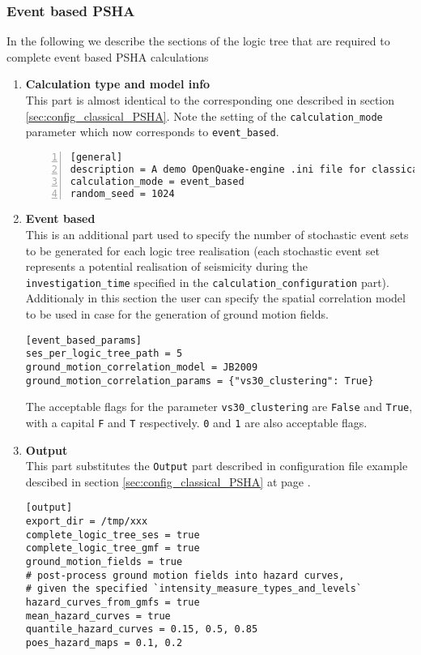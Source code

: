 \subsubsection{Event based PSHA}
%
In the following we describe the sections of the logic tree that are 
required to complete event based PSHA calculations 
\begin{enumerate}
\item \textbf{Calculation type and model info} \hfill \\
    This part is almost identical to the corresponding one 
    described in section \ref{sec:config_classical_PSHA}. Note
    the setting of the \texttt{cal\-cu\-lation\_mode} parameter
    which now corresponds to \texttt{event\_based}.
\begin{Verbatim}[frame=single, commandchars=\\\{\}, fontsize=\small,
    numbers=left, numbersep=2pt]
[general]
description = A demo OpenQuake-engine .ini file for classical PSHA
calculation_mode = event_based
random_seed = 1024
\end{Verbatim}
%
\item \textbf{Event based} \hfill \\
This is an additional part used to specify the number of stochastic 
event sets to be generated for each logic tree realisation 
(each stochastic event set represents a potential realisation of seismicity
during the \texttt{in\-ves\-ti\-gation\_time} specified in the 
\texttt{calculation\_configuration} part).
Additionaly in this section the user can specify the spatial correlation
model to be used in case for the generation of ground motion fields. 
\begin{Verbatim}[frame=single, commandchars=\\\{\}, fontsize=\small]
[event_based_params]
ses_per_logic_tree_path = 5
ground_motion_correlation_model = JB2009
ground_motion_correlation_params = {"vs30_clustering": True}
\end{Verbatim}
The acceptable flags for the parameter \verb+vs30_clustering+ are \verb+False+ 
and \verb+True+, with a capital \verb+F+ and \verb+T+ respectively. \verb+0+ 
and \verb+1+ are also acceptable flags.
%
\item \textbf{Output} \hfill \\
This part substitutes the \texttt{Output} part described in 
configuration file example descibed in section \ref{sec:config_classical_PSHA}
at page \pageref{sec:config_classical_PSHA}.
\begin{Verbatim}[frame=single, commandchars=\\\{\}, fontsize=\small]
[output]
export_dir = /tmp/xxx
complete_logic_tree_ses = true
complete_logic_tree_gmf = true
ground_motion_fields = true
# post-process ground motion fields into hazard curves,
# given the specified `intensity_measure_types_and_levels`
hazard_curves_from_gmfs = true
mean_hazard_curves = true
quantile_hazard_curves = 0.15, 0.5, 0.85
poes_hazard_maps = 0.1, 0.2
\end{Verbatim}
%
\end{enumerate}

